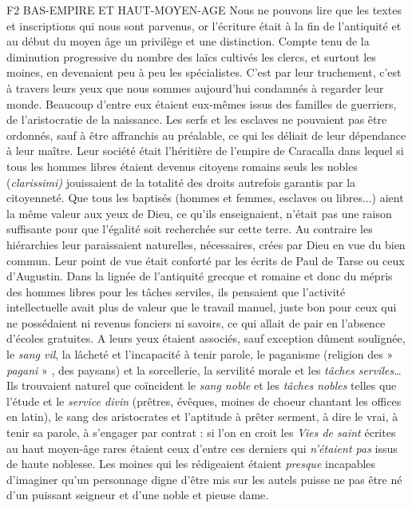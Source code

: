 F2 BAS-EMPIRE ET HAUT-MOYEN-AGE
 Nous ne pouvons lire que les textes et inscriptions qui nous sont parvenus, or l'écriture était à la fin de l'antiquité et au début du moyen âge un privilège et une distinction. Compte tenu de la diminution progressive du nombre des laïcs cultivés les clercs, et surtout les moines, en devenaient peu à peu les spécialistes. C'est par leur truchement, c'est à travers leurs yeux que nous sommes aujourd'hui condamnés à regarder leur monde. Beaucoup d'entre eux étaient eux-mêmes issus des familles de guerriers, de l'aristocratie de la naissance. Les serfs et les esclaves ne pouvaient pas être ordonnés, sauf à être affranchis au préalable, ce qui les déliait de leur dépendance à leur maître. Leur société était l'héritière de l'empire de Caracalla dans lequel si tous les hommes libres étaient devenus citoyens romains seuls les nobles (\emph{clarissimi)} jouissaient de la totalité des droits autrefois garantis par la citoyenneté. Que tous les baptisés (hommes et femmes, esclaves ou libres...) aient la même valeur aux yeux de Dieu, ce qu'ils enseignaient, n'était pas une raison suffisante pour que l'égalité soit recherchée sur cette terre. Au contraire les hiérarchies leur paraissaient naturelles, nécessaires, crées par Dieu en vue du bien commun. Leur point de vue était conforté par les écrits de Paul de Tarse ou ceux d'Augustin.
 Dans la lignée de l'antiquité grecque et romaine et donc du mépris des hommes libres pour les tâches serviles, ils pensaient que l'activité intellectuelle avait plus de valeur que le travail manuel, juste bon pour ceux qui ne possédaient ni revenus fonciers ni savoirs, ce qui allait de pair en l'absence d'écoles gratuites. A leurs yeux étaient associés, sauf exception dûment soulignée, le \emph{sang vil}, la lâcheté et l'incapacité à tenir parole, le paganisme (religion des » \emph{pagani} » , des paysans) et la sorcellerie, la servilité morale et les \emph{tâches serviles}… Ils trouvaient naturel que coïncident le \emph{sang noble} et les \emph{tâches nobles} telles que l'étude et le \emph{service divin} (prêtres, évêques, moines de choeur chantant les offices en latin), le sang des aristocrates et l'aptitude à prêter serment, à dire le vrai, à tenir sa parole, à s'engager par contrat : si l'on en croit les \emph{Vies de saint} écrites au haut moyen-âge rares étaient ceux d'entre ces derniers qui \emph{n'étaient pas} issus de haute noblesse. Les moines qui les rédigeaient étaient \emph{presque} incapables d'imaginer qu'un personnage digne d'être mis sur les autels puisse ne pas être né d'un puissant seigneur et d'une noble et pieuse dame. 
